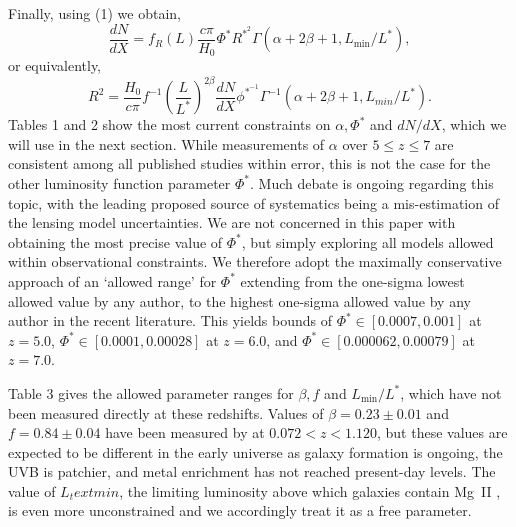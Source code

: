 \documentclass[useAMS,usenatbib]{mn2e}
\newcommand{\magtwo}{Mg~{\small II} }
\begin{document}
Finally, using (1) we obtain,
\begin{equation} 
\frac{dN}{dX} = f_R(L)\frac{c \pi}{H_0} \Phi^* R^{*^2} \Gamma(\alpha+2\beta+1 , L_\text{min}/L^*), 
\end{equation}
or equivalently,
\begin{equation}
 R^{2} =  \frac{H_0}{c\pi} f^{-1} \left(\frac{L}{L^*}\right)^{2\beta} \frac{dN}{dX} \phi^{*^{-1}} \Gamma^{-1}\left(\alpha+2\beta+1, L_{min}/L^*\right).
\end{equation}
Tables 1 and 2 show the most current constraints on $\alpha,\Phi^*$ and $dN/dX$, which we will use in the next section. While measurements of $\alpha$ over $5\leq z\leq 7$ are consistent among all published studies within error, this is not the case for the other luminosity function parameter $\Phi^*$. Much debate is ongoing regarding this topic, with the leading proposed source of systematics being a mis-estimation of the lensing model uncertainties. We are not concerned in this paper with obtaining the most precise value of $\Phi^*$, but simply exploring all models allowed within observational constraints. We therefore adopt the maximally conservative approach of an `allowed range' for $\Phi^*$ extending from the one-sigma lowest allowed value by any author, to the highest one-sigma allowed value by any author in the recent literature. This yields bounds of $\Phi^* \in [0.0007,0.001]$ at $z=5.0$, $\Phi^* \in [0.0001,0.00028]$ at $z=6.0$, and $\Phi^* \in [0.000062,0.00079]$ at $z=7.0$.


Table 3 gives the allowed parameter ranges for $\beta, f$ and $L_\text{min}/L^*$, which have not been measured directly at these redshifts. Values of $\beta=0.23 \pm 0.01$ and $f = 0.84\pm 0.04$ have been measured by  \citet{Nielsen13} at $0.072<z<1.120$, but these values are expected to be different in the early universe as galaxy formation is ongoing, the UVB is patchier, and metal enrichment has not reached present-day levels. The value of $L_text{min}$, the limiting luminosity above which galaxies contain \magtwo, is even more unconstrained and we accordingly treat it as a free parameter.
\end{document}
